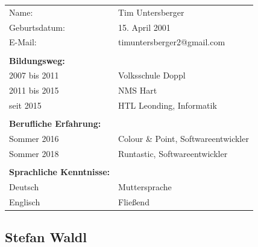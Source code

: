 \begin{table}[htb]
\begin{tabular}{ll}
Name:                            & Tim Untersberger          \\
Geburtsdatum:                    & 15. April 2001                   \\
E-Mail:                          & timuntersberger2@gmail.com          \\
                                 &                               \\
\textbf{Bildungsweg:}            &                               \\  
2007 bis 2011                    & Volksschule Doppl          \\
2011 bis 2015                    & NMS Hart     \\
seit 2015                        & HTL Leonding, Informatik      \\
                                 &                               \\
\textbf{Berufliche Erfahrung:}   &                               \\
Sommer 2016                      & {Colour \& Point}, Softwareentwickler \\
Sommer 2018                      & Runtastic, Softwareentwickler \\
                                 &                               \\
\textbf{Sprachliche Kenntnisse:} &                               \\
Deutsch                          & Muttersprache                 \\
Englisch                         & Fließend                     
\end{tabular}
\end{table}
\pagebreak
\subsection*{Stefan Waldl}
